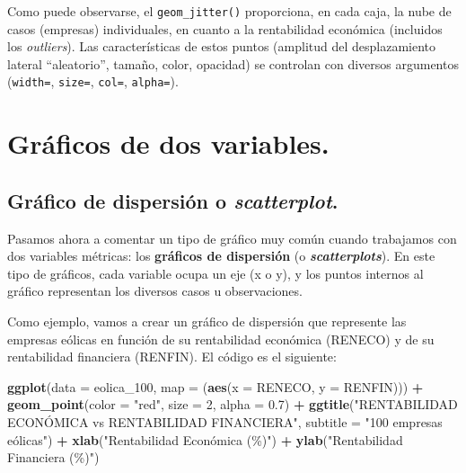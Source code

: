 \documentclass[
]{book}
\newenvironment{Shaded}{\begin{snugshade}}{\end{snugshade}}
\newcommand{\AttributeTok}[1]{\textcolor[rgb]{0.13,0.29,0.53}{#1}}
\newcommand{\DecValTok}[1]{\textcolor[rgb]{0.00,0.00,0.81}{#1}}
\newcommand{\FloatTok}[1]{\textcolor[rgb]{0.00,0.00,0.81}{#1}}
\newcommand{\FunctionTok}[1]{\textcolor[rgb]{0.13,0.29,0.53}{\textbf{#1}}}
\newcommand{\NormalTok}[1]{#1}
\newcommand{\SpecialCharTok}[1]{\textcolor[rgb]{0.81,0.36,0.00}{\textbf{#1}}}
\newcommand{\StringTok}[1]{\textcolor[rgb]{0.31,0.60,0.02}{#1}}
\begin{document}
Como puede observarse, el \texttt{geom\_jitter()} proporciona, en cada caja, la nube de casos (empresas) individuales, en cuanto a la rentabilidad económica (incluidos los \emph{outliers}). Las características de estos puntos (amplitud del desplazamiento lateral ``aleatorio'', tamaño, color, opacidad) se controlan con diversos argumentos (\texttt{width=}, \texttt{size=}, \texttt{col=}, \texttt{alpha=}).

\section{Gráficos de dos variables.}\label{gruxe1ficos-de-dos-variables.}

\subsection{\texorpdfstring{Gráfico de dispersión o \emph{scatterplot}.}{Gráfico de dispersión o scatterplot.}}\label{gruxe1fico-de-dispersiuxf3n-o-scatterplot.}

Pasamos ahora a comentar un tipo de gráfico muy común cuando trabajamos con dos variables métricas: los \textbf{gráficos de dispersión} (o \textbf{\emph{scatterplots}}). En este tipo de gráficos, cada variable ocupa un eje (x o y), y los puntos internos al gráfico representan los diversos casos u observaciones.

Como ejemplo, vamos a crear un gráfico de dispersión que represente las empresas eólicas en función de su rentabilidad económica (RENECO) y de su rentabilidad financiera (RENFIN). El código es el siguiente:

\begin{Shaded}
\begin{Highlighting}[]
\FunctionTok{ggplot}\NormalTok{(}\AttributeTok{data =}\NormalTok{ eolica\_100, }\AttributeTok{map =}\NormalTok{ (}\FunctionTok{aes}\NormalTok{(}\AttributeTok{x =}\NormalTok{ RENECO, }\AttributeTok{y =}\NormalTok{ RENFIN))) }\SpecialCharTok{+}
  \FunctionTok{geom\_point}\NormalTok{(}\AttributeTok{color =} \StringTok{"red"}\NormalTok{, }\AttributeTok{size =} \DecValTok{2}\NormalTok{, }\AttributeTok{alpha =} \FloatTok{0.7}\NormalTok{) }\SpecialCharTok{+}
  \FunctionTok{ggtitle}\NormalTok{(}\StringTok{"RENTABILIDAD ECONÓMICA vs RENTABILIDAD FINANCIERA"}\NormalTok{, }\AttributeTok{subtitle =} \StringTok{"100 empresas eólicas"}\NormalTok{) }\SpecialCharTok{+}
  \FunctionTok{xlab}\NormalTok{(}\StringTok{"Rentabilidad Económica (\%)"}\NormalTok{) }\SpecialCharTok{+}
  \FunctionTok{ylab}\NormalTok{(}\StringTok{"Rentabilidad Financiera (\%)"}\NormalTok{)}
\end{Highlighting}
\end{Shaded}
\end{document}
